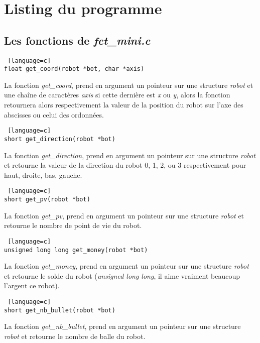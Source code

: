 \documentclass[a4paper, 11pt]{article}
\begin{document}



\newpage
\section{Listing du programme}
\subsection{Les fonctions de \emph{fct\_mini.c}}
\begin {lstlisting} [language=c]
float get_coord(robot *bot, char *axis)
\end{lstlisting}
La fonction \emph{get\_coord}, prend en argument un pointeur sur une structure \emph{robot} et une chaîne de caractères \emph{axis} si cette dernière est \emph{x} ou \emph{y}, alors la fonction retournera alors respectivement la valeur de la position du robot sur l'axe des abscisses ou celui des ordonnées.\\

\begin {lstlisting} [language=c]
short get_direction(robot *bot)
\end{lstlisting}
La fonction \emph{get\_direction}, prend en argument un pointeur sur une structure \emph{robot} et retourne la valeur de la direction du robot 0, 1, 2, ou 3 respectivement pour haut, droite, bas, gauche.\\

\begin {lstlisting} [language=c]
short get_pv(robot *bot)
\end{lstlisting}
La fonction \emph{get\_pv}, prend en argument un pointeur sur une structure \emph{robot} et retourne le nombre de point de vie du robot.\\

\begin {lstlisting} [language=c]
unsigned long long get_money(robot *bot)
\end{lstlisting}
La fonction \emph{get\_money}, prend en argument un pointeur sur une structure \emph{robot} et retourne le solde du robot (\emph{unsigned long long}, il aime vraiment beaucoup l'argent ce robot).\\

\begin {lstlisting} [language=c]
short get_nb_bullet(robot *bot)
\end{lstlisting}
La fonction \emph{get\_nb\_bullet}, prend en argument un pointeur sur une structure \emph{robot} et retourne le nombre de balle du robot.\\
\end{document}
